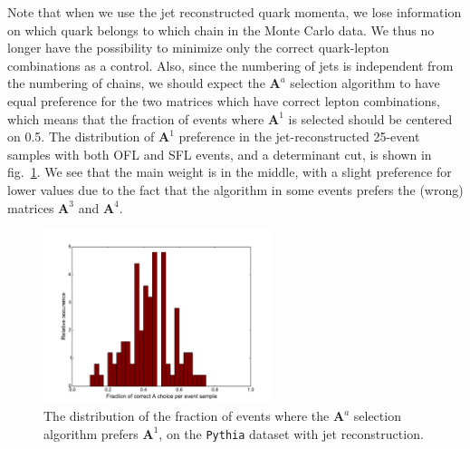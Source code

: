 \documentclass[twoside,english]{uiofysmaster}
\begin{document}
Note that when we use the jet reconstructed quark momenta, we lose information on which quark belongs to which chain in the Monte Carlo data. We thus no longer have the possibility to minimize only the correct quark-lepton combinations as a control. Also, since the numbering of jets is independent from the numbering of chains, we should expect the $\mathbf{A}^a$ selection algorithm to have equal preference for the two matrices which have correct lepton combinations, which means that the fraction of events where $\mathbf A^1$ is selected should be centered on 0.5. The distribution of $\mathbf A^1$ preference in the jet-reconstructed 25-event samples with both OFL and SFL events, and a determinant cut, is shown in fig.\ \ref{fig:histogram_jetrec_A1preference}. We see that the main weight is in the middle, with a slight preference for lower values due to the fact that the algorithm in some events prefers the (wrong) matrices $\mathbf A^3$ and $\mathbf A^4$.
\begin{figure}[hbt]
	\centering
	\includegraphics[width=0.6\textwidth]{figures/improving_combinatorics/histogram_jetrec_OSFL_25evbins_detAcut10.pdf} 
	\caption{The distribution of the fraction of events where the $\mathbf A^a$ selection algorithm prefers $\mathbf A^1$, on the {\tt Pythia} dataset with jet reconstruction.}
	\label{fig:histogram_jetrec_A1preference}
\end{figure}
\end{document}
